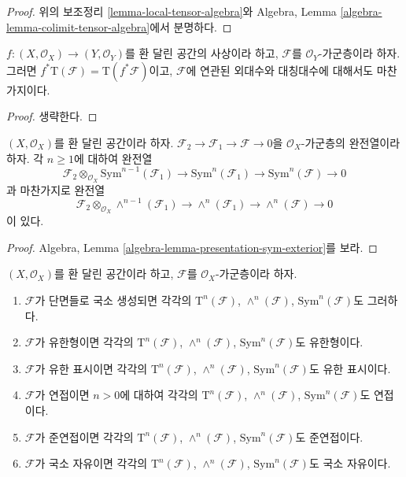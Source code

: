 \begin{proof}
위의 보조정리 \ref{lemma-local-tensor-algebra}와 Algebra, Lemma
\ref{algebra-lemma-colimit-tensor-algebra}에서 분명하다.
\end{proof}

\begin{lemma}
\label{lemma-pullback-tensor-algebra}
$f : (X, \mathcal{O}_X) \to (Y, \mathcal{O}_Y)$를 환 달린 공간의
사상이라 하고, $\mathcal{F}$를 $\mathcal{O}_Y$-가군층이라 하자.
그러면 $f^*\text{T}(\mathcal{F}) = \text{T}(f^*\mathcal{F})$이고,
$\mathcal{F}$에 연관된 외대수와 대칭대수에 대해서도 마찬가지이다.
\end{lemma}

\begin{proof}
생략한다.
\end{proof}

\begin{lemma}
\label{lemma-presentation-sym-exterior}
$(X, \mathcal{O}_X)$를 환 달린 공간이라 하자.
$\mathcal{F}_2 \to \mathcal{F}_1 \to \mathcal{F} \to 0$을
$\mathcal{O}_X$-가군층의 완전열이라 하자. 각 $n \geq 1$에 대하여 완전열
$$
\mathcal{F}_2 \otimes_{\mathcal{O}_X} \text{Sym}^{n - 1}(\mathcal{F}_1)
\to
\text{Sym}^n(\mathcal{F}_1)
\to
\text{Sym}^n(\mathcal{F})
\to
0
$$
과 마찬가지로 완전열
$$
\mathcal{F}_2 \otimes_{\mathcal{O}_X} \wedge^{n - 1}(\mathcal{F}_1)
\to
\wedge^n(\mathcal{F}_1)
\to
\wedge^n(\mathcal{F})
\to
0
$$
이 있다.
\end{lemma}

\begin{proof}
Algebra, Lemma \ref{algebra-lemma-presentation-sym-exterior}를 보라.
\end{proof}

\begin{lemma}
\label{lemma-tensor-algebra-permanence}
$(X, \mathcal{O}_X)$를 환 달린 공간이라 하고,
$\mathcal{F}$를 $\mathcal{O}_X$-가군층이라 하자.
\begin{enumerate}
\item $\mathcal{F}$가 단면들로 국소 생성되면 각각의
$\text{T}^n(\mathcal{F})$, $\wedge^n(\mathcal{F})$,
$\text{Sym}^n(\mathcal{F})$도 그러하다.
\item $\mathcal{F}$가 유한형이면 각각의 $\text{T}^n(\mathcal{F})$,
$\wedge^n(\mathcal{F})$, $\text{Sym}^n(\mathcal{F})$도 유한형이다.
\item $\mathcal{F}$가 유한 표시이면 각각의 $\text{T}^n(\mathcal{F})$,
$\wedge^n(\mathcal{F})$, $\text{Sym}^n(\mathcal{F})$도 유한 표시이다.
\item $\mathcal{F}$가 연접이면 $n > 0$에 대하여 각각의
$\text{T}^n(\mathcal{F})$, $\wedge^n(\mathcal{F})$,
$\text{Sym}^n(\mathcal{F})$도 연접이다.
\item $\mathcal{F}$가 준연접이면 각각의 $\text{T}^n(\mathcal{F})$,
$\wedge^n(\mathcal{F})$, $\text{Sym}^n(\mathcal{F})$도 준연접이다.
\item $\mathcal{F}$가 국소 자유이면 각각의 $\text{T}^n(\mathcal{F})$,
$\wedge^n(\mathcal{F})$, $\text{Sym}^n(\mathcal{F})$도 국소 자유이다.
\end{enumerate}
\end{lemma}

